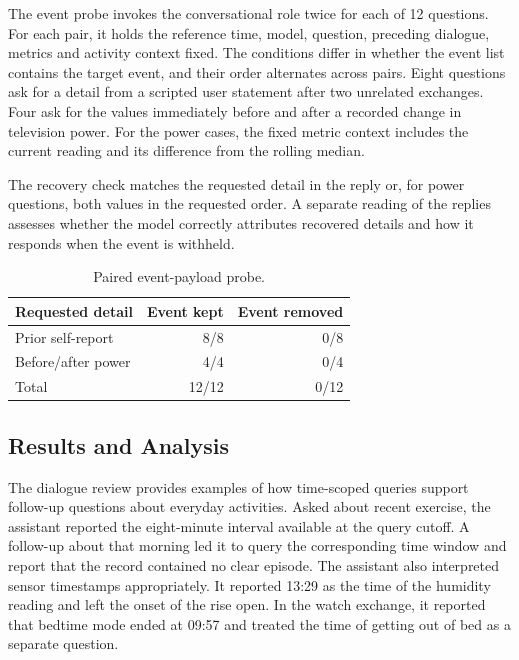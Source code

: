 \documentclass[a4paper,twoside]{article}
\begin{document}
The event probe invokes the conversational role twice for each of 12 questions. For each pair, it holds the reference time, model, question, preceding dialogue, metrics and activity context fixed. The conditions differ in whether the event list contains the target event, and their order alternates across pairs. Eight questions ask for a detail from a scripted user statement after two unrelated exchanges. Four ask for the values immediately before and after a recorded change in television power. For the power cases, the fixed metric context includes the current reading and its difference from the rolling median.

The recovery check matches the requested detail in the reply or, for power questions, both values in the requested order. A separate reading of the replies assesses whether the model correctly attributes recovered details and how it responds when the event is withheld.

\begin{table}[t]
\centering
\caption{Paired event-payload probe.}
\label{tab:probe}
\small
\begin{tabularx}{\columnwidth}{@{}Yrr@{}}
\hline
Requested detail & Event kept & Event removed \\
\hline
Prior self-report & 8/8 & 0/8 \\
Before/after power & 4/4 & 0/4 \\
\hline
Total & 12/12 & 0/12 \\
\hline
\end{tabularx}
\end{table}

\subsection{Results and Analysis}
\label{subsec:eval-findings}

The dialogue review provides examples of how time-scoped queries support follow-up questions about everyday activities. Asked about recent exercise, the assistant reported the eight-minute interval available at the query cutoff. A follow-up about that morning led it to query the corresponding time window and report that the record contained no clear episode. The assistant also interpreted sensor timestamps appropriately. It reported 13:29 as the time of the humidity reading and left the onset of the rise open. In the watch exchange, it reported that bedtime mode ended at 09:57 and treated the time of getting out of bed as a separate question.
\end{document}
